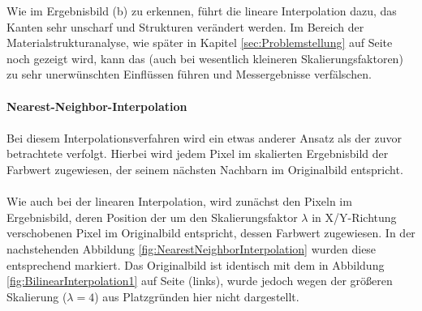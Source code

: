 \documentclass[
fontsize=10pt, 
listof = totoc,
parskip = half	
]{report}
\begin{document}
\noindent Wie im Ergebnisbild (b) zu erkennen, führt die lineare Interpolation dazu, das Kanten sehr unscharf und Strukturen verändert werden. Im Bereich der Materialstrukturanalyse, wie später in Kapitel \ref{sec:Problemstellung} auf Seite \pageref{sec:Problemstellung} noch gezeigt wird, kann das (auch bei wesentlich kleineren Skalierungsfaktoren) zu sehr unerwünschten Einflüssen führen und Messergebnisse verfälschen.
\\\\
\noindent\textbf{Nearest-Neighbor-Interpolation}
\\\\
Bei diesem Interpolationsverfahren wird ein etwas anderer Ansatz als der zuvor betrachtete verfolgt. Hierbei wird jedem Pixel im skalierten Ergebnisbild der Farbwert zugewiesen, der seinem nächsten Nachbarn im Originalbild entspricht. 
\\\\
Wie auch bei der linearen Interpolation, wird zunächst den Pixeln im Ergebnisbild, deren Position der um den Skalierungsfaktor $\lambda$ in X/Y-Richtung verschobenen 
Pixel im Originalbild entspricht, dessen Farbwert zugewiesen. In der nachstehenden Abbildung \ref{fig:NearestNeighborInterpolation} wurden diese entsprechend markiert. Das Originalbild ist identisch mit dem in Abbildung \ref{fig:BilinearInterpolation1} auf Seite \pageref{fig:BilinearInterpolation1} (links), wurde jedoch wegen der größeren Skalierung ($\lambda = 4$) aus Platzgründen hier nicht dargestellt.
\end{document}
